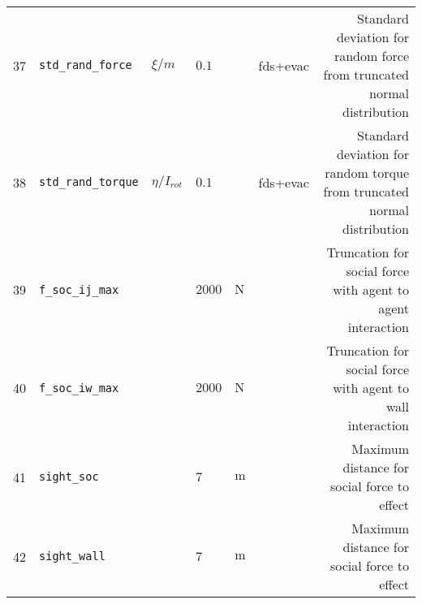 \begin{tabularx}{\linewidth}{llllllR}
37 &  \verb|std_rand_force| &  $\xi / m$ &  $0.1$ &   &  fds+evac &  Standard deviation for random force from truncated normal distribution \\
38 &  \verb|std_rand_torque| &  $\eta / I_{rot}$ &  $0.1$ &   &  fds+evac &  Standard deviation for random torque from truncated normal distribution \\
39 &  \verb|f_soc_ij_max| &   &  $2000$ &  $\mathrm{N}$ &   &  Truncation for social force with agent to agent interaction \\
40 &  \verb|f_soc_iw_max| &   &  $2000$ &  $\mathrm{N}$ &   &  Truncation for social force with agent to wall interaction \\
41 &  \verb|sight_soc| &   &  $7$ &  $\mathrm{m}$ &   &  Maximum distance for social force to effect \\
42 &  \verb|sight_wall| &   &  $7$ &  $\mathrm{m}$ &   &  Maximum distance for social force to effect \\
\bottomrule
\end{tabularx}
